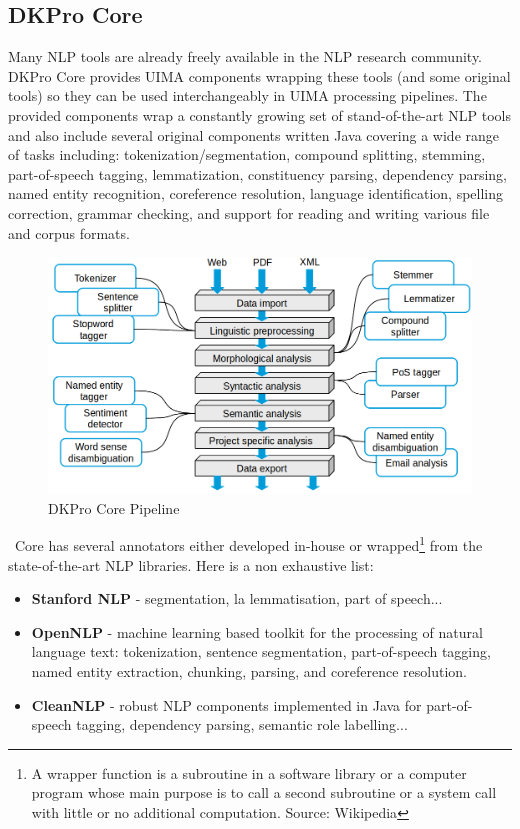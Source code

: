 \subsection{DKPro Core}
Many NLP tools are already freely available in the NLP research community. DKPro Core \cite{TUD-CS-2014-0864} provides UIMA components wrapping these tools (and some original tools) so they can be used interchangeably in UIMA processing pipelines. The provided components wrap a constantly growing set of stand-of-the-art NLP tools and also include several original components written Java covering a wide range of tasks including: tokenization/segmentation, compound splitting, stemming, part-of-speech tagging, lemmatization, constituency parsing, dependency parsing, named entity recognition, coreference resolution, language identification, spelling correction, grammar checking, and support for reading and writing various file and corpus formats. 
\
\begin{figure}[H]
    \centering
    \includegraphics[width=1\textwidth]{fig/dkpro-pipeline.png}
    \caption[Short caption]{DKPro Core Pipeline}
    \label{fig:dkpro-pipeline}
\end{figure}
\
Core has several annotators either developed in-house or wrapped\footnote{A wrapper function is a subroutine in a software library or a computer program whose main purpose is to call a second subroutine or a system call with little or no additional computation. Source: Wikipedia} from the state-of-the-art NLP libraries. Here is a non exhaustive list:
\begin{itemize}
  \item \textbf{Stanford NLP} - segmentation, la lemmatisation, part of speech...
  \item \textbf{OpenNLP} - machine learning based toolkit for the processing of natural language text: tokenization, sentence segmentation, part-of-speech tagging, named entity extraction, chunking, parsing, and coreference resolution. 
  \item \textbf{CleanNLP} - robust NLP components implemented in Java for part-of-speech tagging, dependency parsing, semantic role labelling... 
\end{itemize}

